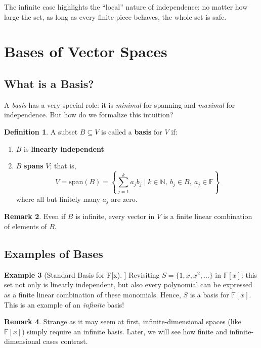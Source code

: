 \documentclass[11pt]{article}
\theoremstyle{definition}
\newtheorem{definition}{Definition}[section]
\newtheorem{example}[definition]{Example}
\newtheorem{remark}[definition]{Remark}
\theoremstyle{plain}
\begin{document}
The infinite case highlights the ``local'' nature of independence: no matter how large the set, as long as every finite piece behaves, the whole set is safe.

\section{Bases of Vector Spaces}

\subsection{What is a Basis?}

A \emph{basis} has a very special role: it is \emph{minimal} for spanning and \emph{maximal} for independence. But how do we formalize this intuition?

\begin{definition}
A subset $B \subseteq V$ is called a \textbf{basis} for $V$ if:
\begin{enumerate}[label=(\arabic*)]
    \item $B$ is \textbf{linearly independent}
    \item $B$ \textbf{spans} $V$; that is,
    \[
    V = \text{span}(B) = \left\{ \sum_{j=1}^{k} a_j b_j \mid k \in \mathbb{N},\ b_j \in B,\ a_j \in \mathbb{F} \right\}
    \]
    where all but finitely many $a_j$ are zero.
\end{enumerate}
\end{definition}

\begin{remark}
Even if $B$ is infinite, every vector in $V$ is a finite linear combination of elements of $B$.
\end{remark}

\subsection{Examples of Bases}

\begin{example}[Standard Basis for F[x]]
Revisiting $S = \{1, x, x^2, \ldots\}$ in $\mathbb{F}[x]$: this set not only is linearly independent, but also every polynomial can be expressed as a finite linear combination of these monomials. Hence, $S$ is a basis for $\mathbb{F}[x]$. This is an example of an \emph{infinite} basis!
\end{example}

\begin{remark}
Strange as it may seem at first, infinite-dimensional spaces (like $\mathbb{F}[x]$) simply require an infinite basis. Later, we will see how finite and infinite-dimensional cases contrast.
\end{remark}
\end{document}
